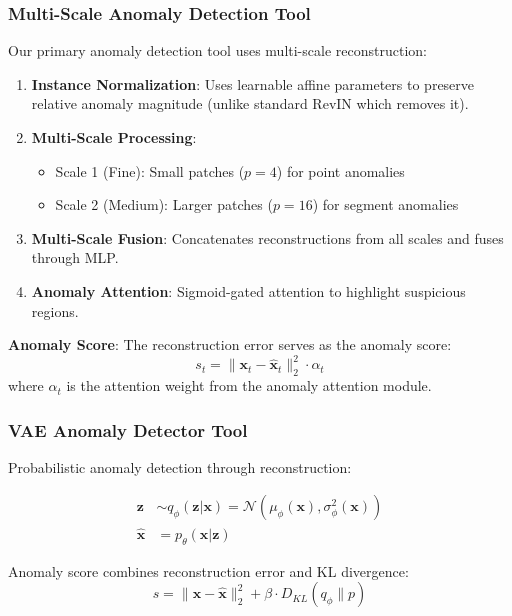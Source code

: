 \subsubsection{Multi-Scale Anomaly Detection Tool}

Our primary anomaly detection tool uses multi-scale reconstruction:

\begin{enumerate}[leftmargin=*, itemsep=1pt]
    \item \textbf{Instance Normalization}: Uses learnable affine parameters to preserve relative anomaly magnitude (unlike standard RevIN which removes it).
    \item \textbf{Multi-Scale Processing}:
    \begin{itemize}
        \item Scale 1 (Fine): Small patches ($p=4$) for point anomalies
        \item Scale 2 (Medium): Larger patches ($p=16$) for segment anomalies
    \end{itemize}
    \item \textbf{Multi-Scale Fusion}: Concatenates reconstructions from all scales and fuses through MLP.
    \item \textbf{Anomaly Attention}: Sigmoid-gated attention to highlight suspicious regions.
\end{enumerate}

\textbf{Anomaly Score}: The reconstruction error serves as the anomaly score:
\begin{equation}
    s_t = \|\mathbf{x}_t - \hat{\mathbf{x}}_t\|_2^2 \cdot \alpha_t
\end{equation}
where $\alpha_t$ is the attention weight from the anomaly attention module.

\subsubsection{VAE Anomaly Detector Tool}

Probabilistic anomaly detection through reconstruction:

\begin{align}
    \mathbf{z} &\sim q_\phi(\mathbf{z}|\mathbf{x}) = \mathcal{N}(\mu_\phi(\mathbf{x}), \sigma_\phi^2(\mathbf{x})) \\
    \hat{\mathbf{x}} &= p_\theta(\mathbf{x}|\mathbf{z})
\end{align}

Anomaly score combines reconstruction error and KL divergence:
\begin{equation}
    s = \|\mathbf{x} - \hat{\mathbf{x}}\|_2^2 + \beta \cdot D_{KL}(q_\phi \| p)
\end{equation}


